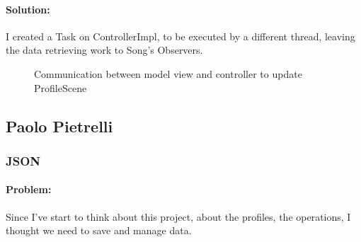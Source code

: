 \documentclass[a4paper,12pt]{report}
\begin{document}
        \paragraph{Solution:}I created a Task on ControllerImpl, to be executed by a different thread, leaving the data retrieving work to Song's Observers.
            \begin{figure}[H]
                \caption{Communication between model view and controller to update ProfileScene}
                \label{fig:my_label}
            \end{figure}

\subsection{Paolo Pietrelli}

	\subsubsection{JSON}
		\paragraph{Problem:}Since I've start to think about this project,  about the profiles, the operations, I thought we need to save and manage data. 
\end{document}
